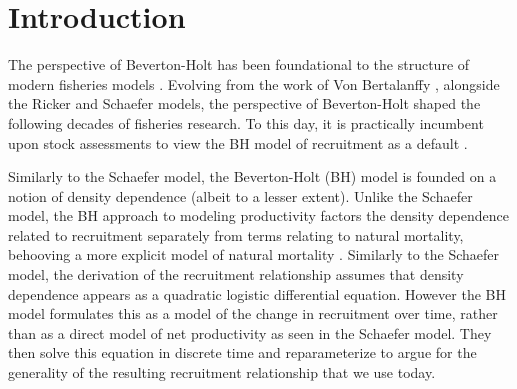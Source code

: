 %
\section{Introduction\label{schnuteInt}}

%
The perspective of Beverton-Holt \cite{beverton_dynamics_1957} has been 
foundational to the structure of modern fisheries models \cite{holden_beverton_1995}. 
Evolving from the work of Von Bertalanffy \cite{von_bertalanffy_quantitative_1938}, 
alongside the Ricker \cite{ricker_stock_1954} and Schaefer \cite{schaefer_study_1957}   
models, the perspective of Beverton-Holt shaped the following decades of fisheries 
research. To this day, it is practically incumbent upon stock assessments to view the 
BH model of recruitment as a default \cite{methot_stock_2013, dick_stock_2023}. %



%
%
%
Similarly to the Schaefer model, the Beverton-Holt (BH) model 
\cite{beverton_dynamics_1957} is founded on a notion of density 
dependence \cite{gotelli_primer_1995} (albeit to a lesser extent). 
Unlike the Schaefer model, the BH approach to modeling productivity factors the 
density dependence related to recruitment separately from terms relating to 
natural mortality, behooving a more explicit model of natural mortality \cite{beverton_review_1959}.
Similarly to the Schaefer model, the derivation of the recruitment 
relationship assumes that density dependence appears as a quadratic logistic 
differential equation. However the BH model formulates this as a model of the 
change in recruitment over time, rather than as a direct model of net productivity 
as seen in the Schaefer model. They then solve this equation in discrete time 
and reparameterize to argue for the generality of the resulting recruitment 
relationship that we use today. 

